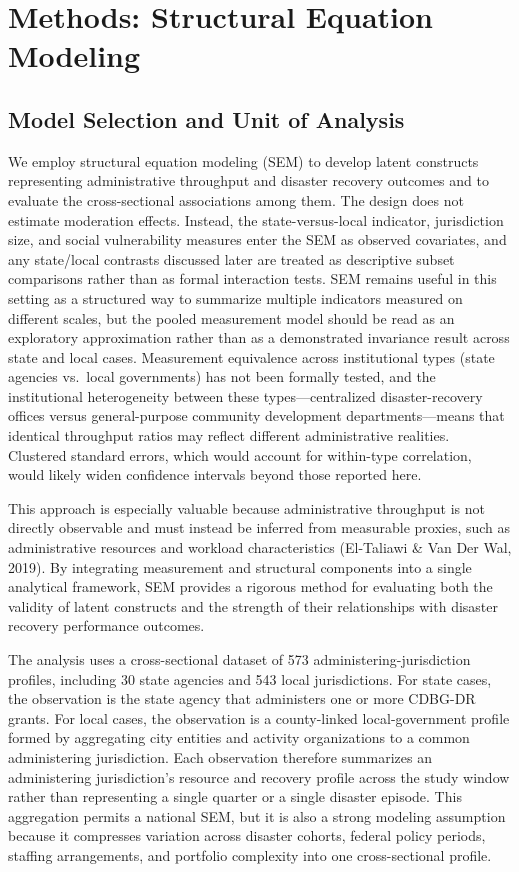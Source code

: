 \documentclass[
  number]{elsarticle}
\begin{document}
\section{Methods: Structural Equation
Modeling}\label{methods-structural-equation-modeling}

\subsection{Model Selection and Unit of
Analysis}\label{model-selection-and-unit-of-analysis}

We employ structural equation modeling (SEM) to develop latent
constructs representing administrative throughput and disaster recovery
outcomes and to evaluate the cross-sectional associations among them.
The design does not estimate moderation effects. Instead, the
state-versus-local indicator, jurisdiction size, and social
vulnerability measures enter the SEM as observed covariates, and any
state/local contrasts discussed later are treated as descriptive subset
comparisons rather than as formal interaction tests. SEM remains useful
in this setting as a structured way to summarize multiple indicators
measured on different scales, but the pooled measurement model should be
read as an exploratory approximation rather than as a demonstrated
invariance result across state and local cases. Measurement equivalence
across institutional types (state agencies vs.~local governments) has
not been formally tested, and the institutional heterogeneity between
these types---centralized disaster-recovery offices versus
general-purpose community development departments---means that identical
throughput ratios may reflect different administrative realities.
Clustered standard errors, which would account for within-type
correlation, would likely widen confidence intervals beyond those
reported here.

This approach is especially valuable because administrative throughput
is not directly observable and must instead be inferred from measurable
proxies, such as administrative resources and workload characteristics
(El-Taliawi \& Van Der Wal, 2019). By integrating measurement and
structural components into a single analytical framework, SEM provides a
rigorous method for evaluating both the validity of latent constructs
and the strength of their relationships with disaster recovery
performance outcomes.

The analysis uses a cross-sectional dataset of 573
administering-jurisdiction profiles, including 30 state agencies and 543
local jurisdictions. For state cases, the observation is the state
agency that administers one or more CDBG-DR grants. For local cases, the
observation is a county-linked local-government profile formed by
aggregating city entities and activity organizations to a common
administering jurisdiction. Each observation therefore summarizes an
administering jurisdiction's resource and recovery profile across the
study window rather than representing a single quarter or a single
disaster episode. This aggregation permits a national SEM, but it is
also a strong modeling assumption because it compresses variation across
disaster cohorts, federal policy periods, staffing arrangements, and
portfolio complexity into one cross-sectional profile.
\end{document}
